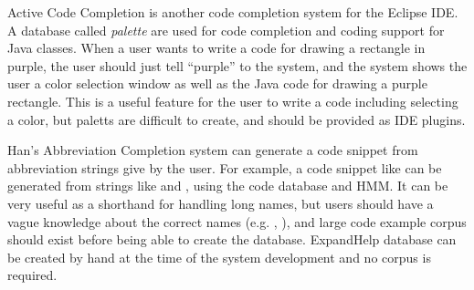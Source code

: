 \documentclass{sigchi}
\def\EH{\textsf{ExpandHelp}}
\begin{document}
Active Code Completion\cite{Omar:2012:ACC:2337223.2337324}
is another code completion system for the Eclipse IDE.
A database called \textit{palette} are used for code completion and coding support
for Java classes.
When a user wants to write a code for drawing a rectangle in purple,
the user should just tell ``purple'' to the system,
and the system shows the user a color selection window
as well as the Java code for drawing a purple rectangle.
This is a useful feature for the user to write a code including selecting
a color, but paletts are difficult to create, and should be provided
as IDE plugins.

Han's Abbreviation Completion system\cite{Han:2009:CCA:1747491.1747530}
can generate a code snippet from abbreviation strings give by the user.
For example, a code snippet like 
can be generated from strings like
 and , using the code database and HMM.
It can be very useful as a shorthand for handling long names,
but users should have a vague knowledge about the correct names
(e.g. , ),
and large code example corpus should exist before being able to
create the database.
{\EH} database can be created by hand at the time of the system development
and no corpus is required.

\end{document}
